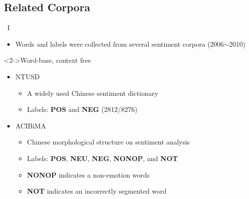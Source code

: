 \documentclass[compress]{beamer}
\begin{document}
    \subsection{Related Corpora}
        \begin{frame}{\subsecname\ I}
            \begin{itemize}
                \item<1-> Words and labels were collected from several sentiment corpora (2006$\sim$2010)
            \end{itemize}
            \begin{block}<2->{Word-base, context free}
                \begin{itemize}
                    \item<2-> NTUSD
                        \begin{itemize}
                            \item<3-> A widely used Chinese sentiment dictionary
                            \item<3-> Labels: \textbf{POS} and \textbf{NEG} (2812/8276) 
                        \end{itemize}
                    \item<2-> ACIBiMA
                        \begin{itemize}
                            \item<4-> Chinese morphological structure on sentiment analysis
                            \item<4-> Labels: \textbf{POS}, \textbf{NEU}, \textbf{NEG}, \textbf{NONOP}, and \textbf{NOT}
                            \item<5-> \textbf{NONOP} indicates a non-emotion words
                            \item<5-> \textbf{NOT} indicates an incorrectly segmented word
                        \end{itemize}
                \end{itemize}
            \end{block}
        \end{frame}
\end{document}
